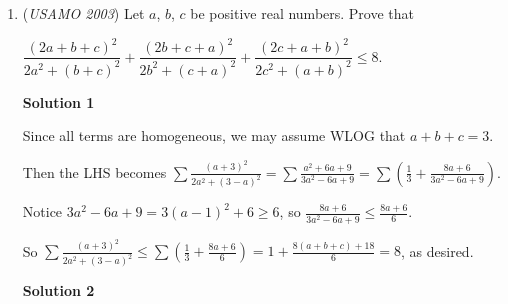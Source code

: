 \begin{enumerate}
 Now we assume that $MC = MF$. Applying Ceva's Theorem to triangle $BCF$ and cevians $BM, CA, FE$ gives
 \[\frac{BA}{AF}\cdot\frac{FM}{MC}\cdot\frac{CE}{EB} = 1,\]implying that $\frac{BA}{AF} = \frac{BE}{EC}$, so $AE\parallel CF$.

 Consequently, $\angle DCM = \angle DAE$. Because quadrilateral $ABED$ is cyclic, $\angle DAE = \angle DBE$. Hence
 \[\angle DCM = \angle DAE = \angle DBE = \angle CBM.\]Because $\angle CBM = \angle DCM$ and $\angle CMB = \angle DMC$, triangles $BCM$ and $CDM$ are similar. Consequently, $\frac{CM}{DM} = \frac{BM}{CM}$, or $CM^2 = BM\cdot DM$.

 Combining the above, we conclude that $MF = MC$ if and only if $MB\cdot MD = MC^2$.

 


 <i>Alternate solutions are always welcome. If you have a different, elegant solution to this problem, please \href{https://artofproblemsolving.com/wiki/index.php?title=2003\_USAMO\_Problems/Problem\_4&action=edit}{add it} to this page.</i>



	\item (\textit{USAMO 2003}) Let $a$, $b$, $c$ be positive real numbers. Prove that


 $\dfrac{(2a + b + c)^2}{2a^2 + (b + c)^2} + \dfrac{(2b + c + a)^2}{2b^2 + (c + a)^2} + \dfrac{(2c + a + b)^2}{2c^2 + (a + b)^2} \le 8.$




\textbf{Solution 1}

Since all terms are homogeneous, we may assume WLOG that $a + b + c = 3$.

 Then the LHS becomes $\sum \frac {(a + 3)^2}{2a^2 + (3 - a)^2} = \sum \frac {a^2 + 6a + 9}{3a^2 - 6a + 9} = \sum \left(\frac {1}{3} + \frac {8a + 6}{3a^2 - 6a + 9}\right)$.

 Notice $3a^2 - 6a + 9 = 3(a - 1)^2 + 6 \ge 6$, so $\frac {8a + 6}{3a^2 - 6a + 9} \le \frac {8a + 6}{6}$.

 So $\sum \frac {(a + 3)^2}{2a^2 + (3 - a)^2} \le \sum \left(\frac {1}{3} + \frac {8a + 6}{6}\right) = 1 + \frac {8(a + b + c) + 18}{6} = 8$, as desired.

 



\textbf{Solution 2}


\end{enumerate}
